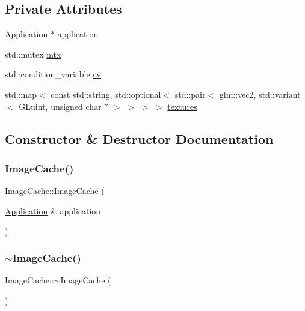 \subsection*{Private Attributes}
\begin{DoxyCompactItemize}
\item 
\mbox{\hyperlink{classsage_1_1Application}{Application}} $\ast$ \mbox{\hyperlink{classsage_1_1ImageCache_a39ed371dca2a9591f78b92623667cc78}{application}}
\item 
std\+::mutex \mbox{\hyperlink{classsage_1_1ImageCache_a1f00cfa79cf2a5dc7364905b0e0ec79e}{mtx}}
\item 
std\+::condition\+\_\+variable \mbox{\hyperlink{classsage_1_1ImageCache_ade561f2902ee4d3c6c4d5cf5c1202846}{cv}}
\item 
std\+::map$<$ const std\+::string, std\+::optional$<$ std\+::pair$<$ glm\+::vec2, std\+::variant$<$ G\+Luint, unsigned char $\ast$ $>$ $>$ $>$ $>$ \mbox{\hyperlink{classsage_1_1ImageCache_a01b8aa5587b2cf9c5e1f1059431f0118}{textures}}
\end{DoxyCompactItemize}


\subsection{Constructor \& Destructor Documentation}
\mbox{\label{classsage_1_1ImageCache_abad3c395b2baa07ce3763a593d253ee4}} 
\subsubsection{\texorpdfstring{ImageCache()}{ImageCache()}}
{\footnotesize\ttfamily Image\+Cache\+::\+Image\+Cache (\begin{DoxyParamCaption}\item[{\mbox{\hyperlink{classsage_1_1Application}{Application}} \&}]{application }\end{DoxyParamCaption})}

\mbox{\label{classsage_1_1ImageCache_a48e8f9fc5513ee195d209cbec596c093}} 
\subsubsection{\texorpdfstring{$\sim$ImageCache()}{~ImageCache()}}
{\footnotesize\ttfamily Image\+Cache\+::$\sim$\+Image\+Cache (\begin{DoxyParamCaption}{ }\end{DoxyParamCaption})}



